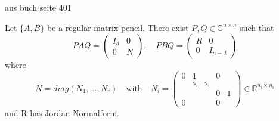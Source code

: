 aus buch seite 401
\begin{theorem}
	\label{Kronecker-Normalform}
	Let $\{ A,B \}$ be a regular matrix pencil. There exist $P,Q \in \mathbb{C}^{n \times n}$ such that
	\begin{displaymath}
		PAQ = 
		\left(
		\begin{matrix}
			I_d & 0 \\
			0 & N 
		\end{matrix}
		\right), \quad
		PBQ = 
		\left(
		\begin{matrix}
			R & 0 \\
			0 & I_{n-d}
		\end{matrix}
		\right)
	\end{displaymath}
	where
	\begin{displaymath}
		N = diag(N_1, ..., N_r) \quad \text{with} \quad N_i = 
		\left(
		\begin{matrix}
			0 & 1 & & 0\\
			& \ddots &\ddots & \\
			& & & 0 & 1 \\
			0 & & & 0
		\end{matrix}
		\right)
		\in \mathbb{R}^{n_i \times n_i}
	\end{displaymath}
	and R has Jordan Normalform.
\end{theorem}
